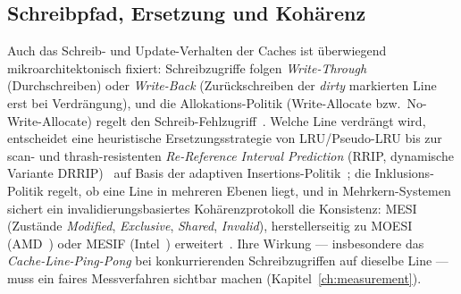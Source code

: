 \begin{nurkurz}
\subsection{Schreibpfad, Ersetzung und Kohärenz}\label{subsec:write-coherence}
Auch das Schreib- und Update-Verhalten der Caches ist überwiegend mikroarchitektonisch fixiert: Schreibzugriffe
folgen \emph{Write-Through} (Durchschreiben) oder \emph{Write-Back} (Zurückschreiben der \emph{dirty} markierten
Line erst bei Verdrängung), und die Allokations-Politik (Write-Allocate bzw.\ No-Write-Allocate) regelt den
Schreib-Fehlzugriff~\cite{arm_arm,intel_sdm}. Welche Line verdrängt wird, entscheidet eine
heuristische Ersetzungsstrategie von LRU/Pseudo-LRU bis zur scan- und thrash-resistenten \emph{Re-Reference
Interval Prediction} (RRIP, dynamische Variante DRRIP)~\cite{jaleel2010rrip} auf Basis der adaptiven
Insertions-Politik~\cite{qureshi2007adaptive}; die Inklusions-Politik regelt, ob eine Line in mehreren Ebenen
liegt, und in Mehrkern-Systemen sichert ein invalidierungsbasiertes Kohärenzprotokoll die Konsistenz:
MESI (Zustände \emph{Modified}, \emph{Exclusive}, \emph{Shared}, \emph{Invalid}), herstellerseitig zu MOESI
(AMD~\cite{amd_sog}) oder MESIF (Intel~\cite{intel_optimization}) erweitert~\cite{hennessy2019architecture}. Ihre
Wirkung --- insbesondere das \emph{Cache-Line-Ping-Pong} bei konkurrierenden Schreibzugriffen auf dieselbe Line ---
muss ein faires Messverfahren sichtbar machen (Kapitel~\ref{ch:measurement}).
\end{nurkurz}

